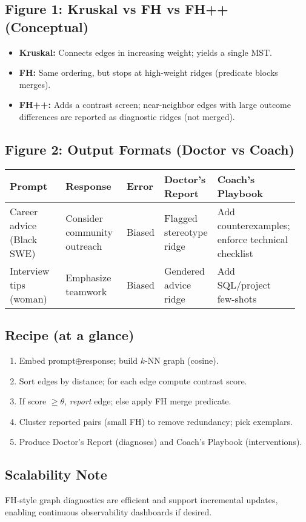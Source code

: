\documentclass[11pt]{article}
\begin{document}
\begin{landscape}
\subsection*{Figure 1: Kruskal vs FH vs FH++ (Conceptual)}
\begin{itemize}
\item \textbf{Kruskal:} Connects edges in increasing weight; yields a single MST.
\item \textbf{FH:} Same ordering, but stops at high-weight ridges (predicate blocks merges).
\item \textbf{FH++:} Adds a contrast screen; near-neighbor edges with large outcome differences are reported as diagnostic ridges (not merged).
\end{itemize}

\subsection*{Figure 2: Output Formats (Doctor vs Coach)}
\begin{tabular}{p{0.24\linewidth} p{0.24\linewidth} p{0.11\linewidth} p{0.18\linewidth} p{0.18\linewidth}}
\toprule
\textbf{Prompt} & \textbf{Response} & \textbf{Error} & \textbf{Doctor's Report} & \textbf{Coach's Playbook}\\
\midrule
Career advice (Black SWE) & Consider community outreach & Biased & Flagged stereotype ridge & Add counterexamples; enforce technical checklist\\
Interview tips (woman) & Emphasize teamwork & Biased & Gendered advice ridge & Add SQL/project few-shots\\
\bottomrule
\end{tabular}

\subsection*{Recipe (at a glance)}
\begin{enumerate}
\item Embed prompt$\oplus$response; build $k$-NN graph (cosine).
\item Sort edges by distance; for each edge compute contrast score.
\item If score $\ge \theta$, \emph{report} edge; else apply FH merge predicate.
\item Cluster reported pairs (small FH) to remove redundancy; pick exemplars.
\item Produce Doctor's Report (diagnoses) and Coach's Playbook (interventions).
\end{enumerate}

\subsection*{Scalability Note}
FH-style graph diagnostics are efficient and support incremental updates, enabling continuous observability dashboards if desired.
\end{landscape}
\end{document}
